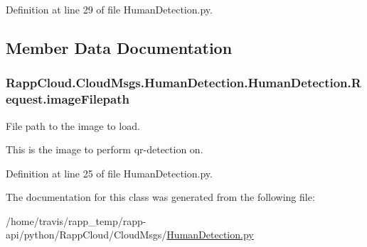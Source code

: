 Definition at line 29 of file Human\-Detection.\-py.



\subsection{Member Data Documentation}
\hypertarget{classRappCloud_1_1CloudMsgs_1_1HumanDetection_1_1HumanDetection_1_1Request_af1b63325406319b5a28aeb349c527d89}{
\subsubsection[{image\-Filepath}]{\setlength{\rightskip}{0pt plus 5cm}Rapp\-Cloud.\-Cloud\-Msgs.\-Human\-Detection.\-Human\-Detection.\-Request.\-image\-Filepath}}\label{classRappCloud_1_1CloudMsgs_1_1HumanDetection_1_1HumanDetection_1_1Request_af1b63325406319b5a28aeb349c527d89}


File path to the image to load. 

This is the image to perform qr-\/detection on. 

Definition at line 25 of file Human\-Detection.\-py.



The documentation for this class was generated from the following file\-:\begin{DoxyCompactItemize}
\item 
/home/travis/rapp\-\_\-temp/rapp-\/api/python/\-Rapp\-Cloud/\-Cloud\-Msgs/\hyperlink{HumanDetection_8py}{Human\-Detection.\-py}\end{DoxyCompactItemize}
